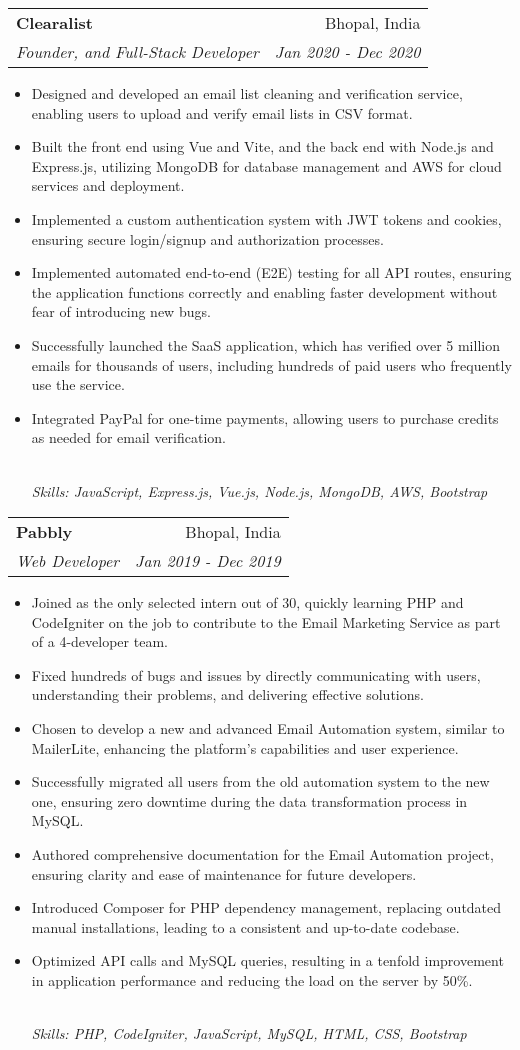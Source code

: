 \documentclass[letterpaper,12pt]{article}
\makeatletter
\newcommand{\resumeItem}[1]{
  \item\small{#1}\vspace{-2pt}
}
\newcommand{\resumeSubheading}[4]{
  \vspace{-2pt}\item
    \begin{tabular*}{0.97\textwidth}[t]{l@{\extracolsep{\fill}}r}
      \textbf{#1} & \small{#2} \\
      \textit{\small{#3}} & \textit{\small{#4}} \\
    \end{tabular*}\vspace{-5pt}
}
\newcommand{\resumeItemFooter}[1]{
    \\ \vspace{7pt}\hspace{-0.35in}\footnotesize\emph{#1}
}
\newcommand{\resumeItemListStart}{\begin{itemize}}
\newcommand{\resumeItemListEnd}{\end{itemize}\vspace{-5pt}}
\def\myHometown{Bhopal, India}
\makeatother
\begin{document}
\resumeSubheading
{Clearalist}{\myHometown}
{Founder, and Full-Stack Developer}{Jan 2020 - Dec 2020}
\resumeItemListStart
\resumeItem{Designed and developed an email list cleaning and verification service, enabling users to upload and verify email lists in CSV format.}
\resumeItem{Built the front end using Vue and Vite, and the back end with Node.js and Express.js, utilizing MongoDB for database management and AWS for cloud services and deployment.}
\resumeItem{Implemented a custom authentication system with JWT tokens and cookies, ensuring secure login/signup and authorization processes.}
\resumeItem{Implemented automated end-to-end (E2E) testing for all API routes, ensuring the application functions correctly and enabling faster development without fear of introducing new bugs.}
\resumeItem{Successfully launched the SaaS application, which has verified over 5 million emails for thousands of users, including hundreds of paid users who frequently use the service.}
\resumeItem{Integrated PayPal for one-time payments, allowing users to purchase credits as needed for email verification.}
\resumeItemFooter{Skills: JavaScript, Express.js, Vue.js, Node.js, MongoDB, AWS, Bootstrap}
\resumeItemListEnd

\resumeSubheading
{Pabbly}{\myHometown}
{Web Developer}{Jan 2019 - Dec 2019}
\resumeItemListStart
\resumeItem{Joined as the only selected intern out of 30, quickly learning PHP and CodeIgniter on the job to contribute to the Email Marketing Service as part of a 4-developer team.}
\resumeItem{Fixed hundreds of bugs and issues by directly communicating with users, understanding their problems, and delivering effective solutions.}
\resumeItem{Chosen to develop a new and advanced Email Automation system, similar to MailerLite, enhancing the platform's capabilities and user experience.}
\resumeItem{Successfully migrated all users from the old automation system to the new one, ensuring zero downtime during the data transformation process in MySQL.}
\resumeItem{Authored comprehensive documentation for the Email Automation project, ensuring clarity and ease of maintenance for future developers.}
\resumeItem{Introduced Composer for PHP dependency management, replacing outdated manual installations, leading to a consistent and up-to-date codebase.}
\resumeItem{Optimized API calls and MySQL queries, resulting in a tenfold improvement in application performance and reducing the load on the server by 50\%.}
\resumeItemFooter{Skills: PHP, CodeIgniter, JavaScript, MySQL, HTML, CSS, Bootstrap}
\resumeItemListEnd
\end{document}
